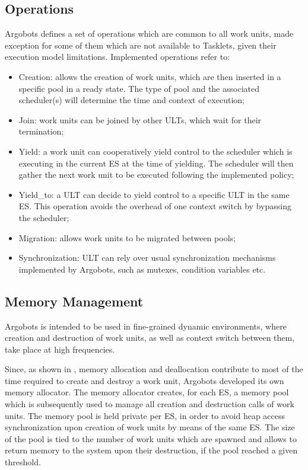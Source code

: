\subsection{Operations}
Argobots defines a set of operations which are common to all work units, made exception for some of them which are not available to Tasklets, given their execution model limitations. Implemented operations refer to:
\begin{itemize}
    \item Creation: allows the creation of work units, which are then inserted in a specific pool in a ready state. The type of pool and the associated scheduler(s) will determine the time and context of execution;
    \item Join: work units can be joined by other ULTs, which wait for their termination;
    \item Yield: a work unit can cooperatively yield control to the scheduler which is executing in the current ES at the time of yielding. The scheduler will then gather the next work unit to be executed following the implemented policy;
    \item Yield\_to: a ULT can decide to yield control to a specific ULT in the same ES. This operation avoids the overhead of one context switch by bypassing the scheduler;
    \item Migration: allows work units to be migrated between pools;
    \item Synchronization: ULT can rely over usual synchronization mechanisms implemented by Argobots, such as mutexes, condition variables etc.
\end{itemize}

\subsection{Memory Management}
Argobots is intended to be used in fine-grained dynamic environments, where creation and destruction of work units, as well as context switch between them, take place at high frequencies.\newline

Since, as shown in \cite{argobots-paper}, memory allocation and deallocation contribute to most of the time required to create and destroy a work unit, Argobots developed its own memory allocator. The memory allocator creates, for each ES, a memory pool which is subsequently used to manage all creation and destruction calls of work units. The memory pool is held private per ES, in order to avoid heap access synchronization upon creation of work units by means of the same ES. The size of the pool is tied to the number of work units which are spawned and allows to return memory to the system upon their destruction, if the pool reached a given threshold.\newline

